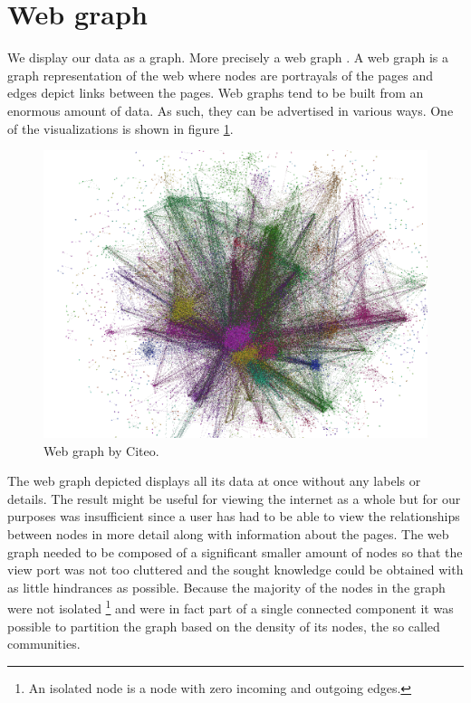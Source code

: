 \section{Web graph} \label{webGraph}
We display our data as a graph. More precisely a web graph \cite{the_web_graph_overview}. A web graph is a graph representation of the web where nodes are portrayals of the pages and edges depict links between the pages. Web graphs tend to be built from an enormous amount of data. As such, they can  be advertised in various ways. One of the visualizations is shown in figure  \ref{hugeWebGraphFireworks}. 
\begin{figure}[ht!]
  \centering
  \includegraphics[width=\textwidth]{Images/hugeWebGraphFireworks.png}
  \caption{Web graph by Citeo.}
  \label{hugeWebGraphFireworks}
\end{figure} 
The web graph depicted displays all its data at once without any labels or details. The result might be useful for viewing the internet as a whole but for our purposes was insufficient since a user has had to be able to view the relationships between nodes in more detail along with information about the pages. The web graph needed to be composed of a significant smaller amount of nodes so that the view port was not too cluttered and the sought knowledge could be obtained with as little hindrances as possible. Because the majority of the nodes in the graph were not isolated \footnote{An isolated node is a node with zero incoming and outgoing edges.} and were in fact part of a single connected component it was possible to partition the graph based on the density of its nodes, the so called communities.

